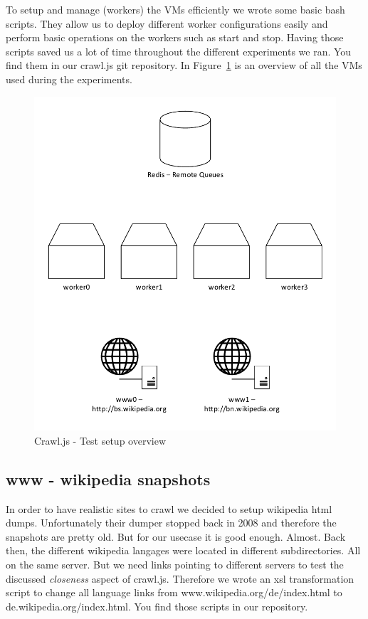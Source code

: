 To setup and manage (workers) the VMs efficiently we wrote some basic bash scripts. They allow us to deploy different worker configurations easily and perform basic operations on the workers such as start and stop. Having those scripts saved us a lot of time throughout the different experiments we ran. You find them in our crawl.js git repository. In Figure~\ref{test_setup} is an overview of all the VMs used during the experiments.

\begin{figure}[h]
\centering
  \includegraphics[width=1\textwidth]{Figures/test_setup.pdf}
\caption{Crawl.js - Test setup overview}
\label{test_setup}
\end{figure}

\subsection{www - wikipedia snapshots}
In order to have realistic sites to crawl we decided to setup wikipedia html dumps. Unfortunately their dumper stopped back in 2008 and therefore the snapshots are pretty old. But for our usecase it is good enough. Almost. Back then, the different wikipedia langages were located in different subdirectories. All on the same server. But we need links pointing to different servers to test the discussed \emph{closeness} aspect of crawl.js. Therefore we wrote an xsl transformation script to change all language links from www.wikipedia.org/de/index.html to de.wikipedia.org/index.html. You find those scripts in our repository.


